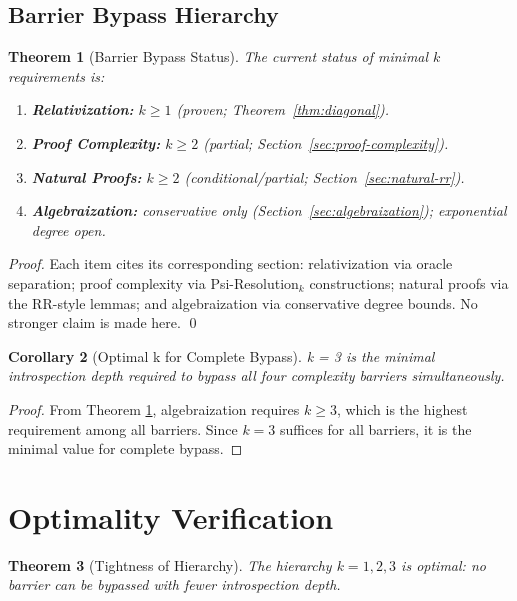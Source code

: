 \documentclass[11pt]{article}
\newtheorem{theorem}{Theorem}[section]
\newtheorem{corollary}[theorem]{Corollary}
\theoremstyle{definition}
\begin{document}
\subsection{Barrier Bypass Hierarchy}

\begin{theorem}[Barrier Bypass Status]
\label{thm:barrier-hierarchy}
The current status of minimal $k$ requirements is:
\begin{enumerate}
\item \textbf{Relativization:} $k \geq 1$ (proven; Theorem~\ref{thm:diagonal}).
\item \textbf{Proof Complexity:} $k \geq 2$ (partial; Section~\ref{sec:proof-complexity}).
\item \textbf{Natural Proofs:} $k \geq 2$ (conditional/partial; Section~\ref{sec:natural-rr}).
\item \textbf{Algebraization:} conservative only (Section~\ref{sec:algebraization}); exponential degree open.
\end{enumerate}
\end{theorem}

\begin{proof}
Each item cites its corresponding section: relativization via oracle separation; proof complexity via Psi-Resolution$_k$ constructions; natural proofs via the RR-style lemmas; and algebraization via conservative degree bounds. No stronger claim is made here. \qed
\end{proof}

\begin{corollary}[Optimal k for Complete Bypass]
\label{cor:optimal-k}
k = 3 is the minimal introspection depth required to bypass all four complexity barriers simultaneously.
\end{corollary}

\begin{proof}
From Theorem \ref{thm:barrier-hierarchy}, algebraization requires $k \geq 3$, which is the highest requirement among all barriers. Since $k=3$ suffices for all barriers, it is the minimal value for complete bypass.
\end{proof}

\section{Optimality Verification}

\begin{theorem}[Tightness of Hierarchy]
The hierarchy $k=1,2,3$ is optimal: no barrier can be bypassed with fewer introspection depth.
\end{theorem}
\end{document}
